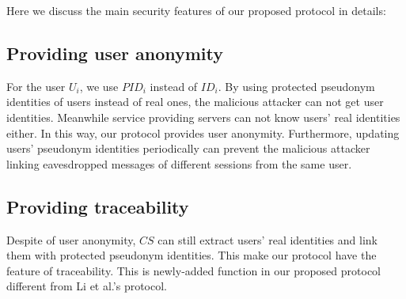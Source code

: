 \documentclass[preprint,12pt]{elsarticle}
\begin{document}
\begin{table}[h]
\centering
\caption{Security functionality comparison of our protocol and two other related protocols}
\end{table}

Here we discuss the main security features of our proposed protocol in details:

\subsection{Providing user anonymity}

For the user $U_i$, we use $PID_i$ instead of $ID_i$. By using protected pseudonym identities of users instead of real ones, the malicious attacker can not get user identities. Meanwhile service providing servers can not know users' real identities either. In this way, our protocol provides user anonymity. Furthermore, updating users' pseudonym identities periodically can prevent the malicious attacker linking eavesdropped messages of different sessions from the same user.

\subsection{Providing traceability}
Despite of user anonymity, $CS$ can still extract users' real identities and link them with protected pseudonym identities. This make our protocol have the feature of traceability. This is newly-added function in our proposed protocol different from Li et al.'s protocol.
\end{document}
